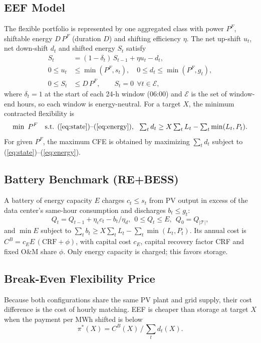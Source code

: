 \documentclass[conference]{IEEEtran}
\begin{document}
\subsection{EEF Model}
The flexible portfolio is represented by one aggregated class with power $P^F$, shiftable energy $D\,P^F$ (duration $D$) and shifting efficiency $\eta$. The net up-shift $u_t$, net down-shift $d_t$ and shifted energy $S_t$ satisfy
\begin{align}
S_t &= (1-\delta_t)\,S_{t-1} + \eta u_t - d_t, \label{eq:state}\\
0 \le u_t &\le \min(P^F, s_t),\quad 0 \le d_t \le \min(P^F, g_t), \label{eq:bounds}\\
0 \le S_t &\le D\,P^F,\qquad S_t = 0\ \ \forall t \in \mathcal{E}, \label{eq:energy}
\end{align}
where $\delta_t=1$ at the start of each 24-h window (06:00) and $\mathcal{E}$ is the set of window-end hours, so each window is energy-neutral. For a target $X$, the minimum contracted flexibility is
\begin{equation}
\min\ P^F \quad \text{s.t. (\ref{eq:state})--(\ref{eq:energy})},\ \ \textstyle\sum_t d_t \ge X\sum_t L_t - \sum_t \min(L_t,P_t).
\label{eq:eefmin}
\end{equation}
For given $P^F$, the maximum CFE is obtained by maximizing $\sum_t d_t$ subject to (\ref{eq:state})--(\ref{eq:energy}).

\subsection{Battery Benchmark (RE+BESS)}
A battery of energy capacity $E$ charges $c_t\le s_t$ from PV output in excess of the data center's same-hour consumption and discharges $b_t\le g_t$:
\begin{equation}
Q_t = Q_{t-1} + \eta_c c_t - b_t/\eta_d,\ \ 0\le Q_t\le E,\ \ Q_0=Q_{|\mathcal{T}|},
\end{equation}
and $\min E$ subject to $\sum_t b_t \ge X\sum_t L_t - \sum_t \min(L_t,P_t)$. Its annual cost is $C^B = c_E E\,(\mathrm{CRF}+\phi)$, with capital cost $c_E$, capital recovery factor CRF and fixed O\&M share $\phi$. Only energy capacity is charged; this favors storage.

\subsection{Break-Even Flexibility Price}
Because both configurations share the same PV plant and grid supply, their cost difference is the cost of hourly matching. EEF is cheaper than storage at target $X$ when the payment per MWh shifted is below
\begin{equation}
\pi^\ast(X) = C^B(X)\,\big/\,\textstyle\sum_t d_t(X).
\end{equation}
\end{document}
